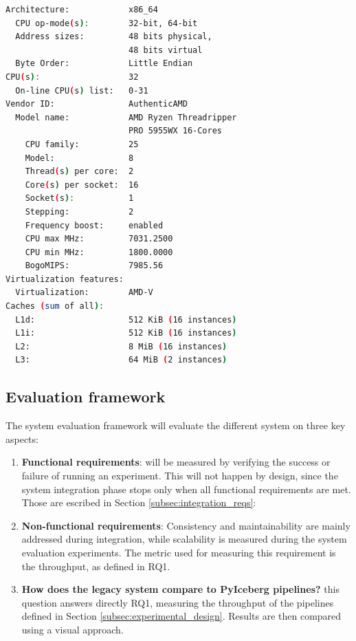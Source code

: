 \begin{lstlisting}[language=bash, caption={[Experimental environment details]Output of a \textit{lscpu} bash command on the machine.}, label={lst:cpu_snurran}, frame=tb, basicstyle=\small]
Architecture:            x86_64
  CPU op-mode(s):        32-bit, 64-bit
  Address sizes:         48 bits physical, 
                         48 bits virtual
  Byte Order:            Little Endian
CPU(s):                  32
  On-line CPU(s) list:   0-31
Vendor ID:               AuthenticAMD
  Model name:            AMD Ryzen Threadripper 
                         PRO 5955WX 16-Cores
    CPU family:          25
    Model:               8
    Thread(s) per core:  2
    Core(s) per socket:  16
    Socket(s):           1
    Stepping:            2
    Frequency boost:     enabled
    CPU max MHz:         7031.2500
    CPU min MHz:         1800.0000
    BogoMIPS:            7985.56
Virtualization features: 
  Virtualization:        AMD-V
Caches (sum of all):     
  L1d:                   512 KiB (16 instances)
  L1i:                   512 KiB (16 instances)
  L2:                    8 MiB (16 instances)
  L3:                    64 MiB (2 instances)
\end{lstlisting}



\subsection{Evaluation framework}
\label{subsec:method_eval_framework}

The system evaluation framework will evaluate the different system on three key aspects:
\begin{enumerate}
    \item \textbf{Functional requirements}: will be measured by verifying the success or failure of running an experiment. This will not happen by design, since the system integration phase stops only when all functional requirements are met. Those are escribed in Section \ref{subsec:integration_reqs}:
    \item \textbf{Non-functional requirements}: Consistency and maintainability are mainly addressed during integration, while scalability is measured during the system evaluation experiments. The metric used for measuring this requirement is the throughput, as defined in \gls{RQ}1.
    \item \textbf{How does the legacy system compare to PyIceberg pipelines?} this question answers directly \gls{RQ}1, measuring the throughput of the pipelines defined in Section \ref{subsec:experimental_design}. Results are then compared using a visual approach.
\end{enumerate} 



